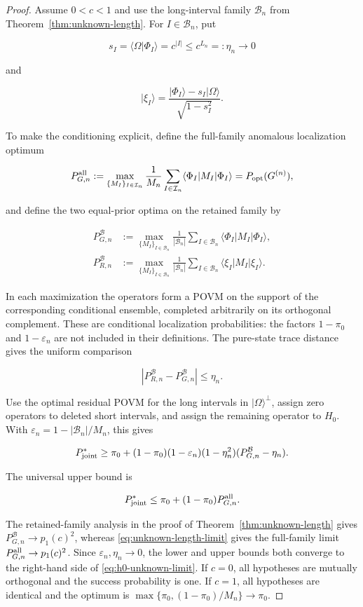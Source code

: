 \begin{proof}
Assume \(0<c<1\) and use the long-interval family \(\mathcal B_n\) from Theorem~\ref{thm:unknown-length}. For \(I\in\mathcal B_n\), put

\[
s_I=\langle\Omega|\Phi_I\rangle=c^{|I|}\le c^{L_n}=:\eta_n\to0
\]

and

\[
|\xi_I\rangle
=\frac{|\Phi_I\rangle-s_I|\Omega\rangle}{\sqrt{1-s_I^2}}.
\]

To make the conditioning explicit, define the full-family anomalous
localization optimum

\[
P_{G,n}^{\rm all}
:=\max_{\{M_I\}_{I\in\mathcal I_n}}
\frac1{M_n}\sum_{I\in\mathcal I_n}
\langle\Phi_I|M_I|\Phi_I\rangle
=P_{\rm opt}(G^{(n)}),
\]

and define the two equal-prior optima on the retained family by

\begin{align*}
P_{G,n}^{\mathcal B}
&:=\max_{\{M_I\}_{I\in\mathcal B_n}}
\frac1{|\mathcal B_n|}\sum_{I\in\mathcal B_n}
\langle\Phi_I|M_I|\Phi_I\rangle,\\
P_{R,n}^{\mathcal B}
&:=\max_{\{M_I\}_{I\in\mathcal B_n}}
\frac1{|\mathcal B_n|}\sum_{I\in\mathcal B_n}
\langle\xi_I|M_I|\xi_I\rangle.
\end{align*}

In each maximization the operators form a POVM on the support of the
corresponding conditional ensemble, completed arbitrarily on its orthogonal
complement. These are conditional localization probabilities: the factors
\(1-\pi_0\) and \(1-\varepsilon_n\) are not included in their definitions.
The pure-state trace distance gives the uniform comparison

\[
|P_{R,n}^{\mathcal B}-P_{G,n}^{\mathcal B}|\le\eta_n.
\]

Use the optimal residual POVM for the long intervals in \(|\Omega\rangle^\perp\), assign zero operators to deleted short intervals, and assign the remaining operator to \(H_0\). With \(\varepsilon_n=1-|\mathcal B_n|/M_n\), this gives

\[
P_{\rm joint}^*
\ge\pi_0+(1-\pi_0)(1-\varepsilon_n)(1-\eta_n^2)
(P_{G,n}^{\mathcal B}-\eta_n).
\]

The universal upper bound is

\[
P_{\rm joint}^*
\le\pi_0+(1-\pi_0)P_{G,n}^{\rm all}.
\]

The retained-family analysis in the proof of
Theorem~\ref{thm:unknown-length} gives
\(P_{G,n}^{\mathcal B}\to p_1(c)^2\), whereas
\eqref{eq:unknown-length-limit} gives the full-family limit
\(P_{G,n}^{\rm all}\to p_1(c)^2\). Since
\(\varepsilon_n,\eta_n\to0\), the lower and upper bounds both converge to the
right-hand side of \eqref{eq:h0-unknown-limit}. If \(c=0\), all hypotheses are
mutually orthogonal and the success probability is one. If \(c=1\), all
hypotheses are identical and the optimum is
\(\max\{\pi_0,(1-\pi_0)/M_n\}\to\pi_0\).
\end{proof}

